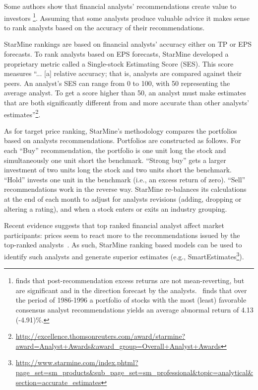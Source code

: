 \documentclass[a4paper,12pt,openright,notitlepage]{report}\usepackage[]{graphicx}\usepackage[]{color}
\begin{document}
Some authors show that financial analysts' recommendations create value to investors \citep{womack1996,barber2001}\footnote{\cite{womack1996} finds that  post-recommendation excess returns are not mean-reverting, but are significant and in the direction forecast by the analysts.~\cite{barber2001} finds that over the period of 1986-1996 a portfolio of stocks with the most (least) favorable consensus analyst recommendations yields an average abnormal return of 4.13 (-4.91)\%.}. Assuming that some analysts produce valuable advice it makes sense to rank analysts based on the accuracy of their recommendations.

StarMine rankings are based on financial analysts' accuracy either on TP or EPS forecasts. To rank analysts based on EPS forecasts, StarMine developed a proprietary metric called a Single-stock Estimating Score (SES). This score measures ``... [a] relative accuracy; that is, analysts are compared against their peers. An analyst's SES can range from 0 to 100, with 50 representing the average analyst. To get a score higher than 50, an analyst must make estimates that are both significantly different from and more accurate than other analysts' estimates''\footnote{\url{http://excellence.thomsonreuters.com/award/starmine?award=Analyst+Awards&award_group=Overall+Analyst+Awards}}.


As for target price ranking, StarMine's methodology compares the portfolios based on analysts recommendations. Portfolios are constructed as follows. For each ``Buy'' recommendation, the portfolio is one unit long the stock and simultaneously one unit short the benchmark. ``Strong buy'' gets a larger investment of two units long the stock and two units short the benchmark. ``Hold'' invests one unit in the benchmark (i.e., an excess return of zero). ``Sell'' recommendations work in the reverse way. StarMine re-balances its calculations at the end of each month to adjust for analysts revisions (adding, dropping or altering a rating), and when a stock enters or exits an industry grouping.


Recent evidence suggests that top ranked financial analyst affect market participants: prices seem to react more to the recommendations issued by the top-ranked analysts~\citep{emery2009}. As such, StarMine ranking based models can be used to identify such analysts and generate superior estimates (e.g., SmartEstimates\footnote{\url{http://www.starmine.com/index.phtml?page_set=sm_products&sub_page_set=sm_professional&topic=analytical&section=accurate_estimates}}).
\end{document}
